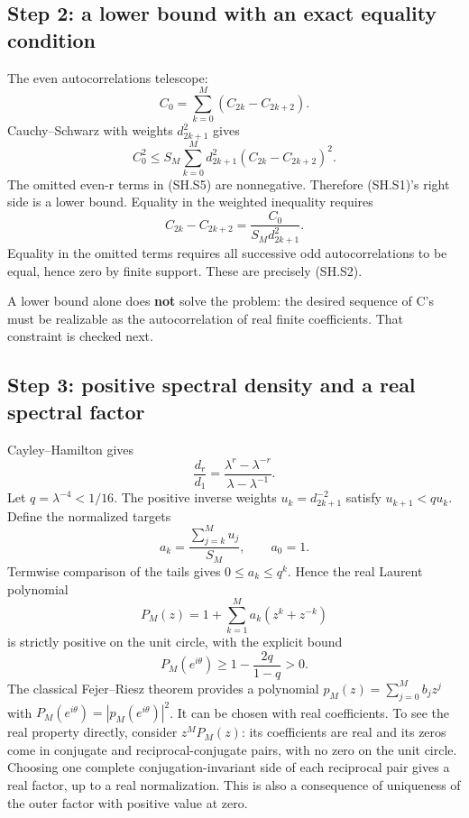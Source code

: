 \subsection{Step 2: a lower bound with an exact equality condition}\label{sharp:step-2-a-lower-bound-with-an-exact-equality-condition}

The even autocorrelations telescope: \[
 C_0=\sum_{k=0}^{M}(C_{2k}-C_{2k+2}).
\] Cauchy--Schwarz with weights \(d_{2k+1}^2\) gives \[
 C_0^2\leq S_M\sum_{k=0}^Md_{2k+1}^2(C_{2k}-C_{2k+2})^2.
\] The omitted even-r terms in (SH.S5) are nonnegative. Therefore (SH.S1)'s right side is a lower bound. Equality in the weighted inequality requires \[
 C_{2k}-C_{2k+2}=\frac{C_0}{S_Md_{2k+1}^2}.
\] Equality in the omitted terms requires all successive odd autocorrelations to be equal, hence zero by finite support. These are precisely (SH.S2).

A lower bound alone does \textbf{not} solve the problem: the desired sequence of C's must be realizable as the autocorrelation of real finite coefficients. That constraint is checked next.

\subsection{Step 3: positive spectral density and a real spectral factor}\label{sharp:step-3-positive-spectral-density-and-a-real-spectral-factor}

Cayley--Hamilton gives \[
 \frac{d_r}{d_1}=
 \frac{\lambda^r-\lambda^{-r}}{\lambda-\lambda^{-1}}.
\] Let \(q=\lambda^{-4}<1/16\). The positive inverse weights \(u_k=d_{2k+1}^{-2}\) satisfy \(u_{k+1}<q u_k\). Define the normalized targets \[
 a_k=\frac{\sum_{j=k}^M u_j}{S_M},\qquad a_0=1.
\] Termwise comparison of the tails gives \(0\leq a_k\leq q^k\). Hence the real Laurent polynomial \[
 P_M(z)=1+\sum_{k=1}^M a_k(z^k+z^{-k})
\] is strictly positive on the unit circle, with the explicit bound \[
 P_M(e^{i\theta})\geq1-\frac{2q}{1-q}>0.                    \tag{SH.S6}
\] The classical Fejer--Riesz theorem provides a polynomial \(p_M(z)=\sum_{j=0}^M b_jz^j\) with \(P_M(e^{i\theta})=|p_M(e^{i\theta})|^2\). It can be chosen with real coefficients. To see the real property directly, consider \(z^MP_M(z)\): its coefficients are real and its zeros come in conjugate and reciprocal-conjugate pairs, with no zero on the unit circle. Choosing one complete conjugation-invariant side of each reciprocal pair gives a real factor, up to a real normalization. This is also a consequence of uniqueness of the outer factor with positive value at zero.

